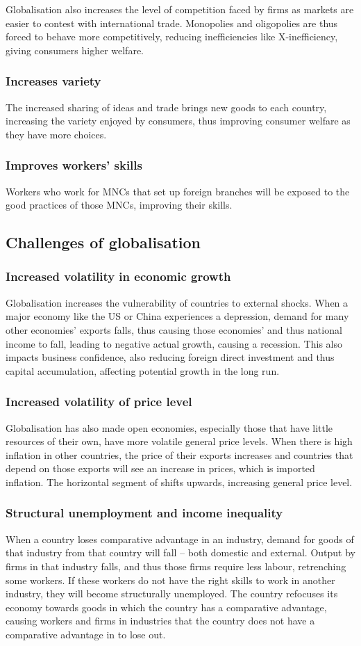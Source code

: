 \documentclass[Economics.tex]{subfiles}
\begin{document}
Globalisation also increases the level of competition faced by firms as markets are easier to contest with international trade. Monopolies and oligopolies are thus forced to behave more competitively, reducing inefficiencies like X-inefficiency, giving consumers higher welfare.
\subsubsection{Increases variety}
The increased sharing of ideas and trade brings new goods to each country, increasing the variety enjoyed by consumers, thus improving consumer welfare as they have more choices.
\subsubsection{Improves workers' skills}
Workers who work for MNCs that set up foreign branches will be exposed to the good practices of those MNCs, improving their skills.
\subsection{Challenges of globalisation}
\subsubsection{Increased volatility in economic growth}
Globalisation increases the vulnerability of countries to external shocks. When a major economy like the US or China experiences a depression, demand for many other economies' exports falls, thus causing those economies' \AD{} and thus national income to fall, leading to negative actual growth, causing a recession. This also impacts business confidence, also reducing foreign direct investment and thus capital accumulation, affecting potential growth in the long run.
\subsubsection{Increased volatility of price level}
Globalisation has also made open economies, especially those that have little resources of their own, have more volatile general price levels. When there is high inflation in other countries, the price of their exports increases and countries that depend on those exports will see an increase in prices, which is imported inflation. The horizontal segment of \AS{} shifts upwards, increasing general price level.
\subsubsection{Structural unemployment and income inequality}
When a country loses comparative advantage in an industry, demand for goods of that industry from that country will fall -- both domestic and external. Output by firms in that industry falls, and thus those firms require less labour, retrenching some workers. If these workers do not have the right skills to work in another industry, they will become structurally unemployed. The country refocuses its economy towards goods in which the country has a comparative advantage, causing workers and firms in industries that the country does not have a comparative advantage in to lose out.
\end{document}
